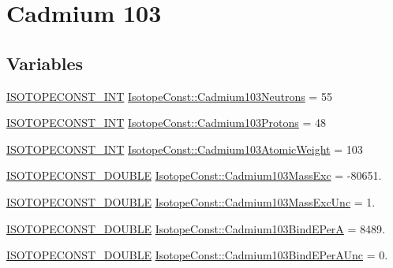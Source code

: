 \hypertarget{group___isotope_const-_cadmium-_cd103}{}\section{Cadmium 103}
\label{group___isotope_const-_cadmium-_cd103}
\subsection*{Variables}
\begin{DoxyCompactItemize}
\item 
\mbox{\hyperlink{group___isotope_const-_macros_ga5f18360b3e99483a35c32d789e62621c}{I\+S\+O\+T\+O\+P\+E\+C\+O\+N\+S\+T\+\_\+\+I\+NT}} \mbox{\hyperlink{group___isotope_const-_cadmium-_cd103_gab14dd4aea3a39bd531bf140446fb8ac5}{Isotope\+Const\+::\+Cadmium103\+Neutrons}} = 55
\item 
\mbox{\hyperlink{group___isotope_const-_macros_ga5f18360b3e99483a35c32d789e62621c}{I\+S\+O\+T\+O\+P\+E\+C\+O\+N\+S\+T\+\_\+\+I\+NT}} \mbox{\hyperlink{group___isotope_const-_cadmium-_cd103_ga475163eb3cea3dfbbf3f6a34812d2be4}{Isotope\+Const\+::\+Cadmium103\+Protons}} = 48
\item 
\mbox{\hyperlink{group___isotope_const-_macros_ga5f18360b3e99483a35c32d789e62621c}{I\+S\+O\+T\+O\+P\+E\+C\+O\+N\+S\+T\+\_\+\+I\+NT}} \mbox{\hyperlink{group___isotope_const-_cadmium-_cd103_ga15a33ca2528d45ac76e48c01b7a516ed}{Isotope\+Const\+::\+Cadmium103\+Atomic\+Weight}} = 103
\item 
\mbox{\hyperlink{group___isotope_const-_macros_ga8f45a7272ce02c0b4c65c44636ed719a}{I\+S\+O\+T\+O\+P\+E\+C\+O\+N\+S\+T\+\_\+\+D\+O\+U\+B\+LE}} \mbox{\hyperlink{group___isotope_const-_cadmium-_cd103_gaf34b1ba0488e719d82382b484ffb6f6c}{Isotope\+Const\+::\+Cadmium103\+Mass\+Exc}} = -\/80651.
\item 
\mbox{\hyperlink{group___isotope_const-_macros_ga8f45a7272ce02c0b4c65c44636ed719a}{I\+S\+O\+T\+O\+P\+E\+C\+O\+N\+S\+T\+\_\+\+D\+O\+U\+B\+LE}} \mbox{\hyperlink{group___isotope_const-_cadmium-_cd103_ga76957e678a50ad5592e2fe4e24b5d08e}{Isotope\+Const\+::\+Cadmium103\+Mass\+Exc\+Unc}} = 1.
\item 
\mbox{\hyperlink{group___isotope_const-_macros_ga8f45a7272ce02c0b4c65c44636ed719a}{I\+S\+O\+T\+O\+P\+E\+C\+O\+N\+S\+T\+\_\+\+D\+O\+U\+B\+LE}} \mbox{\hyperlink{group___isotope_const-_cadmium-_cd103_gad90648168a4f0763f7ff029814fdba77}{Isotope\+Const\+::\+Cadmium103\+Bind\+E\+PerA}} = 8489.
\item 
\mbox{\hyperlink{group___isotope_const-_macros_ga8f45a7272ce02c0b4c65c44636ed719a}{I\+S\+O\+T\+O\+P\+E\+C\+O\+N\+S\+T\+\_\+\+D\+O\+U\+B\+LE}} \mbox{\hyperlink{group___isotope_const-_cadmium-_cd103_gad808dc6f085a902cbc1bd084dabe744f}{Isotope\+Const\+::\+Cadmium103\+Bind\+E\+Per\+A\+Unc}} = 0.

\end{DoxyCompactItemize}

